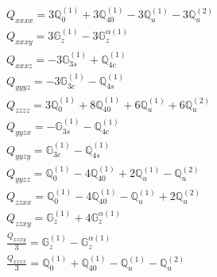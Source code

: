 \documentclass[fleqn,8pt,landscape]{jsarticle}
\begin{document}
\begin{align*}
& Q_{xxxx} = 3 \mathbb{Q}_{0}^{(1)} + 3 \mathbb{Q}_{40}^{(1)} - 3 \mathbb{Q}_{u}^{(1)} - 3 \mathbb{Q}_{u}^{(2)} \\
& Q_{xxxy} = 3 \mathbb{G}_{z}^{(1)} - 3 \mathbb{G}_{z}^{\alpha(1)} \\
& Q_{xxxz} = - 3 \mathbb{G}_{3s}^{(1)} + \mathbb{Q}_{4c}^{(1)} \\
& Q_{yyyz} = - 3 \mathbb{G}_{3c}^{(1)} - \mathbb{Q}_{4s}^{(1)} \\
& Q_{zzzz} = 3 \mathbb{Q}_{0}^{(1)} + 8 \mathbb{Q}_{40}^{(1)} + 6 \mathbb{Q}_{u}^{(1)} + 6 \mathbb{Q}_{u}^{(2)} \\
& Q_{yyzx} = - \mathbb{G}_{3s}^{(1)} - \mathbb{Q}_{4c}^{(1)} \\
& Q_{yyzy} = \mathbb{G}_{3c}^{(1)} - \mathbb{Q}_{4s}^{(1)} \\
& Q_{yyzz} = \mathbb{Q}_{0}^{(1)} - 4 \mathbb{Q}_{40}^{(1)} + 2 \mathbb{Q}_{u}^{(1)} - \mathbb{Q}_{u}^{(2)} \\
& Q_{zzxx} = \mathbb{Q}_{0}^{(1)} - 4 \mathbb{Q}_{40}^{(1)} - \mathbb{Q}_{u}^{(1)} + 2 \mathbb{Q}_{u}^{(2)} \\
& Q_{zzxy} = \mathbb{G}_{z}^{(1)} + 4 \mathbb{G}_{z}^{\alpha(1)} \\
& \frac{Q_{xxxy}}{3} = \mathbb{G}_{z}^{(1)} - \mathbb{G}_{z}^{\alpha(1)} \\
& \frac{Q_{xxxx}}{3} = \mathbb{Q}_{0}^{(1)} + \mathbb{Q}_{40}^{(1)} - \mathbb{Q}_{u}^{(1)} - \mathbb{Q}_{u}^{(2)}
\end{align*}
\end{document}
